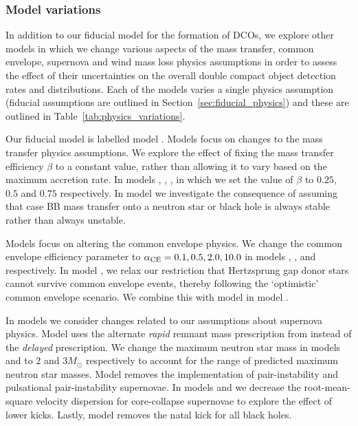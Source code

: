 \subsubsection{Model variations} \label{sec:variation_assumptions}
In addition to our fiducial model for the formation of DCOs, we explore \nMinusOneModels{} other models in which we change various aspects of the mass transfer, common envelope, supernova and wind mass loss physics assumptions in order to assess the effect of their uncertainties on the overall double compact object detection rates and distributions. Each of the models varies a single physics assumption (fiducial assumptions are outlined in Section~\ref{sec:fiducial_physics}) and these are outlined in Table~\ref{tab:physics_variations}.

Our fiducial model is labelled model \modFid{}. Models \modRangeMT{} focus on changes to the mass transfer physics assumptions. We explore the effect of fixing the mass transfer efficiency $\beta$ to a constant value, rather than allowing it to vary based on the maximum accretion rate. In models \modBetaLow{}, \modBetaMed{}, \modBetaHigh{}, in which we set the value of $\beta$ to $0.25$, $0.5$ and $0.75$ respectively. In model \modCaseBB{} we investigate the consequence of assuming that case BB mass transfer onto a neutron star or black hole is always stable rather than always unstable.

Models \modRangeCE{} focus on altering the common envelope physics. We change the common envelope efficiency parameter to $\alpha_{\rm CE} = 0.1, 0.5, 2.0, 10.0$ in models \modAlphaLowest{}, \modAlphaLow{}, \modAlphaHigh{} and \modAlphaHighest{} respectively. In model \modOpt{}, we relax our restriction that Hertzsprung gap donor stars cannot survive common envelope events, thereby following the `optimistic' common envelope scenario. We combine this with model \modCaseBB{} in model \modCaseBBOpt{}.

In models \modRangeSN{} we consider changes related to our assumptions about supernova physics. Model \modRapid{} uses the alternate \textit{rapid} remnant mass prescription from \citet{Fryer+2012} instead of the \textit{delayed} prescription. We change the maximum neutron star mass in models \modNSLow{} and \modNSHigh{} to $2$ and $3 \unit{M_{\odot}}$ respectively to account for the range of predicted maximum neutron star masses. Model \modNoPISN{} removes the implementation of pair-instability and pulsational pair-instability supernovae. In models \modSigLow{} and \modSigLower{} we decrease the root-mean-square velocity dispersion for core-collapse supernovae to explore the effect of lower kicks. Lastly, model \modNoBH{} removes the natal kick for all black holes.

